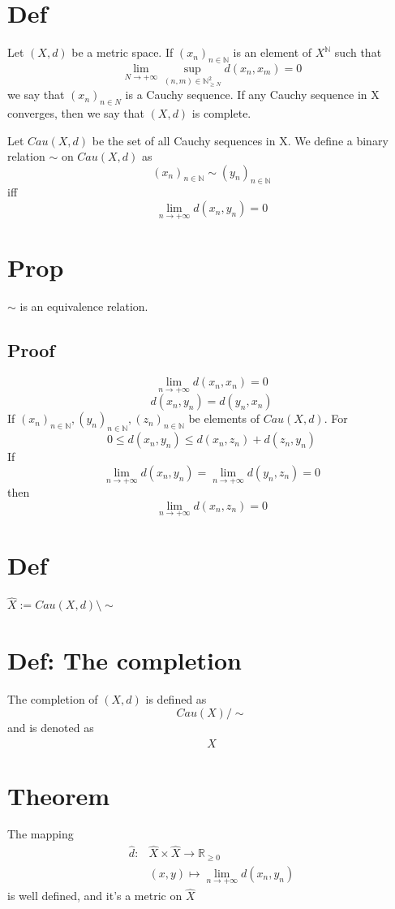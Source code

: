 \documentclass{book}
\begin{document}
\section{Def}Let $(X,d)$ be a metric space. If $(x_n)_{n\in \mathbb{N}}$ is an element of $X^\mathbb{N}$ such that $$\lim\limits_{N\rightarrow+\infty}\sup\limits_{(n,m)\in \mathbb{N}^2_{\geq N}}d(x_n,x_m)=0$$we say that $(x_n)_{n\in N}$ is a Cauchy sequence. If any Cauchy sequence in X converges, then we say that $(X,d)$ is complete.

Let $Cau(X,d)$ be the set of all Cauchy sequences in X. We define a binary relation $\sim$ on $Cau(X,d)$ as $$(x_n)_{n\in \mathbb{N}}\sim(y_n)_{n\in \mathbb{N}}$$iff$$\lim_{n\rightarrow+\infty}d(x_n,y_n)=0$$
\section{Prop}
$\sim$ is an equivalence relation.
\subsection{Proof}
$$\lim\limits_{n\rightarrow+\infty}d(x_n,x_n)=0$$
$$d(x_n,y_n)=d(y_n,x_n)$$
If $(x_n)_{n\in \mathbb{N}},(y_n)_{n\in \mathbb{N}},(z_n)_{n\in \mathbb{N}}$ be elements of $Cau(X,d)$. For $$0\leq d(x_n,y_n)\leq d(x_n,z_n)+d(z_n,y_n)$$ If $$\lim\limits_{n\rightarrow+\infty}d(x_n,y_n)=\lim\limits_{n\rightarrow+\infty}d(y_n,z_n)=0$$ then $$\lim\limits_{n\rightarrow+\infty}d(x_n,z_n)=0$$
\section{Def}
$\hat{X}:=Cau(X,d)\setminus \sim$
\section{Def: The completion}
The completion of $(X,d)$ is defined as $$Cau(X)/\sim$$ and is denoted as $$\hat{X}$$
\section{Theorem}
The mapping $$
\begin{aligned}
    \hat{d}: & \hat{X}\times\hat{X}\rightarrow \mathbb{R}_{\geq 0}\\ &(x,y)\mapsto \lim\limits_{n\rightarrow +\infty}d(x_n,y_n)
\end{aligned}$$
is well defined, and it's a metric on $\hat{X}$ 
\end{document}
